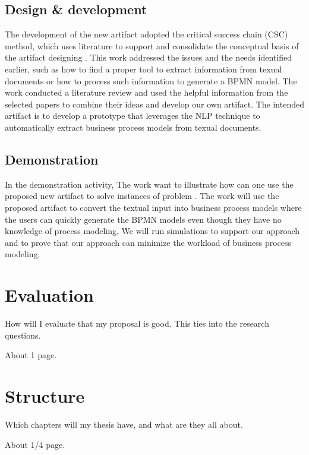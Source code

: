 \subsection{Design \& development}
The development of the new artifact adopted the critical success chain (CSC) method, which uses literature to support and consolidate the conceptual basis of the artifact designing \cite{DSM_2}. This work addressed the issues and the needs identified earlier, such as how to find a proper tool to extract information from texual documents or how to process such information to generate a BPMN model. The work conducted a literature review and used the helpful information from the selected papers to combine their ideas and develop our own artifact. The intended artifact is to develop a prototype that leverages the NLP technique to automatically extract business process models from texual documents.

\subsection{Demonstration}
In the demonstration activity, The work want to illustrate how can one use the proposed new artifact to solve instances of problem \cite{DSM_3}. The work will use the proposed artifact to convert the textual input into business process models where the users can quickly generate the BPMN models even though they have no knowledge of process modeling. We will run simulations to support our approach and to prove that our approach can minimize the workload of business process modeling.

\section{Evaluation}
\label{sec:intro:ev}

How will I evaluate that my proposal is good. This ties into the research questions.

About 1 page.

\section{Structure}
\label{sec:intro:struct}

Which chapters will my thesis have, and what are they all about.

About 1/4 page.
